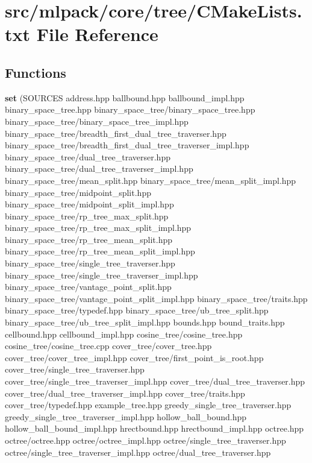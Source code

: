 \section{src/mlpack/core/tree/\+C\+Make\+Lists.txt File Reference}
\label{core_2tree_2CMakeLists_8txt}
\subsection*{Functions}
\begin{DoxyCompactItemize}
\item 
{\bf set} (S\+O\+U\+R\+C\+ES address.\+hpp ballbound.\+hpp ballbound\+\_\+impl.\+hpp binary\+\_\+space\+\_\+tree.\+hpp binary\+\_\+space\+\_\+tree/binary\+\_\+space\+\_\+tree.\+hpp binary\+\_\+space\+\_\+tree/binary\+\_\+space\+\_\+tree\+\_\+impl.\+hpp binary\+\_\+space\+\_\+tree/breadth\+\_\+first\+\_\+dual\+\_\+tree\+\_\+traverser.\+hpp binary\+\_\+space\+\_\+tree/breadth\+\_\+first\+\_\+dual\+\_\+tree\+\_\+traverser\+\_\+impl.\+hpp binary\+\_\+space\+\_\+tree/dual\+\_\+tree\+\_\+traverser.\+hpp binary\+\_\+space\+\_\+tree/dual\+\_\+tree\+\_\+traverser\+\_\+impl.\+hpp binary\+\_\+space\+\_\+tree/mean\+\_\+split.\+hpp binary\+\_\+space\+\_\+tree/mean\+\_\+split\+\_\+impl.\+hpp binary\+\_\+space\+\_\+tree/midpoint\+\_\+split.\+hpp binary\+\_\+space\+\_\+tree/midpoint\+\_\+split\+\_\+impl.\+hpp binary\+\_\+space\+\_\+tree/rp\+\_\+tree\+\_\+max\+\_\+split.\+hpp binary\+\_\+space\+\_\+tree/rp\+\_\+tree\+\_\+max\+\_\+split\+\_\+impl.\+hpp binary\+\_\+space\+\_\+tree/rp\+\_\+tree\+\_\+mean\+\_\+split.\+hpp binary\+\_\+space\+\_\+tree/rp\+\_\+tree\+\_\+mean\+\_\+split\+\_\+impl.\+hpp binary\+\_\+space\+\_\+tree/single\+\_\+tree\+\_\+traverser.\+hpp binary\+\_\+space\+\_\+tree/single\+\_\+tree\+\_\+traverser\+\_\+impl.\+hpp binary\+\_\+space\+\_\+tree/vantage\+\_\+point\+\_\+split.\+hpp binary\+\_\+space\+\_\+tree/vantage\+\_\+point\+\_\+split\+\_\+impl.\+hpp binary\+\_\+space\+\_\+tree/traits.\+hpp binary\+\_\+space\+\_\+tree/typedef.\+hpp binary\+\_\+space\+\_\+tree/ub\+\_\+tree\+\_\+split.\+hpp binary\+\_\+space\+\_\+tree/ub\+\_\+tree\+\_\+split\+\_\+impl.\+hpp bounds.\+hpp bound\+\_\+traits.\+hpp cellbound.\+hpp cellbound\+\_\+impl.\+hpp cosine\+\_\+tree/cosine\+\_\+tree.\+hpp cosine\+\_\+tree/cosine\+\_\+tree.\+cpp cover\+\_\+tree/cover\+\_\+tree.\+hpp cover\+\_\+tree/cover\+\_\+tree\+\_\+impl.\+hpp cover\+\_\+tree/first\+\_\+point\+\_\+is\+\_\+root.\+hpp cover\+\_\+tree/single\+\_\+tree\+\_\+traverser.\+hpp cover\+\_\+tree/single\+\_\+tree\+\_\+traverser\+\_\+impl.\+hpp cover\+\_\+tree/dual\+\_\+tree\+\_\+traverser.\+hpp cover\+\_\+tree/dual\+\_\+tree\+\_\+traverser\+\_\+impl.\+hpp cover\+\_\+tree/traits.\+hpp cover\+\_\+tree/typedef.\+hpp example\+\_\+tree.\+hpp greedy\+\_\+single\+\_\+tree\+\_\+traverser.\+hpp greedy\+\_\+single\+\_\+tree\+\_\+traverser\+\_\+impl.\+hpp hollow\+\_\+ball\+\_\+bound.\+hpp hollow\+\_\+ball\+\_\+bound\+\_\+impl.\+hpp hrectbound.\+hpp hrectbound\+\_\+impl.\+hpp octree.\+hpp octree/octree.\+hpp octree/octree\+\_\+impl.\+hpp octree/single\+\_\+tree\+\_\+traverser.\+hpp octree/single\+\_\+tree\+\_\+traverser\+\_\+impl.\+hpp octree/dual\+\_\+tree\+\_\+traverser.\+hpp 
\end{DoxyCompactItemize}
